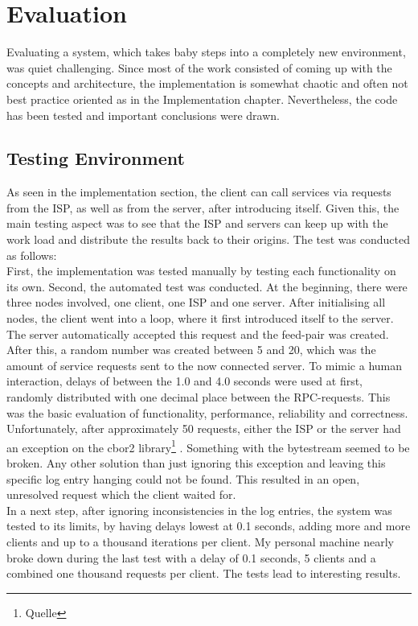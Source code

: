 \chapter{Evaluation}
Evaluating a system, which takes baby steps into a completely new environment, was quiet challenging. Since most of the work consisted of coming up with the concepts and architecture, the implementation is somewhat chaotic and often not best practice oriented as in the Implementation chapter. Nevertheless, the code has been tested and important conclusions were drawn.
\section{Testing Environment}
As seen in the implementation section, the client can call services via requests from the ISP, as well as from the server, after introducing itself. Given this, the main testing aspect was to see that the ISP and servers can keep up with the work load and distribute the results back to their origins. The test was conducted as follows:\\
First, the implementation was tested manually by testing each functionality on its own. Second, the automated test was conducted. At the beginning, there were three nodes involved, one client, one ISP and one server. After initialising all nodes, the client went into a loop, where it first introduced itself to the server. The server automatically accepted this request and the feed-pair was created. After this, a random number was created between 5 and 20, which was the amount of service requests sent to the now connected server. To mimic a human interaction, delays of between the 1.0 and 4.0 seconds were used at first, randomly distributed with one decimal place between the RPC-requests. This was the basic evaluation of functionality, performance, reliability and correctness.\\
Unfortunately, after approximately 50 requests, either the ISP or the server had an exception on the cbor2 library\footnote{Quelle} . Something with the bytestream seemed to be broken. Any other solution than just ignoring this exception and leaving this specific log entry hanging could not be found. This resulted in an open, unresolved request which the client waited for. \\
In a next step, after ignoring inconsistencies in the log entries, the system was tested to its limits, by having delays lowest at 0.1 seconds, adding more and more clients and up to a thousand iterations per client. My personal machine nearly broke down during the last test with a delay of 0.1 seconds, 5 clients and a combined one thousand requests per client. The tests lead to interesting results.


